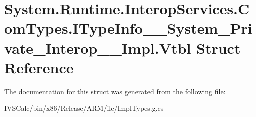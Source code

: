 \hypertarget{struct_system_1_1_runtime_1_1_interop_services_1_1_com_types_1_1_i_type_info_____system___private___interop_____impl_1_1_vtbl}{}\section{System.\+Runtime.\+Interop\+Services.\+Com\+Types.\+I\+Type\+Info\+\_\+\+\_\+\+System\+\_\+\+Private\+\_\+\+Interop\+\_\+\+\_\+\+Impl.\+Vtbl Struct Reference}
\label{struct_system_1_1_runtime_1_1_interop_services_1_1_com_types_1_1_i_type_info_____system___private___interop_____impl_1_1_vtbl}


The documentation for this struct was generated from the following file\+:\begin{DoxyCompactItemize}
\item 
I\+V\+S\+Calc/bin/x86/\+Release/\+A\+R\+M/ilc/Impl\+Types.\+g.\+cs\end{DoxyCompactItemize}
